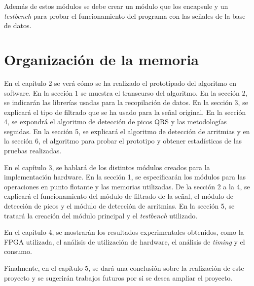 	Además de estos módulos se debe crear un módulo que los encapsule y un \textit{testbench} para probar el funcionamiento del programa con las señales de la base de datos\cite{desai2021low}.

\section{Organización de la memoria}
En el capítulo 2 se verá cómo se ha realizado el prototipado del algoritmo en software. En la sección 1 se muestra el transcurso del algoritmo. En la sección 2, se indicarán las librerías usadas para la recopilación de datos. En la sección 3, se explicará el tipo de filtrado que se ha usado para la señal original. En la sección 4, se expondrá el algoritmo de detección de picos QRS y las metodologías seguidas. En la sección 5, se explicará el algoritmo de detección de arritmias y en la sección 6, el algoritmo para probar el prototipo y obtener estadísticas de las pruebas realizadas.

En el capítulo 3, se hablará de los distintos módulos creados para la implementación hardware. En la sección 1, se especificarán los módulos para las operaciones en punto flotante y las memorias utilizadas. De la sección 2 a la 4, se explicará el funcionamiento del módulo de filtrado de la señal, el módulo de detección de picos y el módulo de detección de arritmias. En la sección 5, se tratará la creación del módulo principal y el \textit{testbench} utilizado.

En el capítulo 4, se mostrarán los resultados experimentales obtenidos, como la FPGA utilizada, el análisis de utilización de hardware, el análisis de  \textit{timing}  y el consumo.

Finalmente, en el capítulo 5, se dará una conclusión sobre la realización de este proyecto y se sugerirán trabajos futuros por si se desea ampliar el proyecto.
